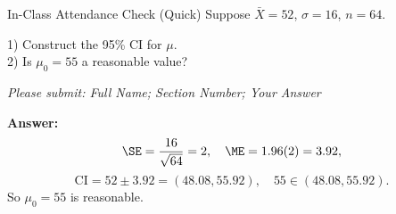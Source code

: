 \documentclass[aspectratio=169]{beamer}
\begin{document}
\begin{frame}{In-Class Attendance Check (Quick)}
  Suppose \(\bar X=52\), \(\sigma=16\), \(n=64\).

  \vspace{1mm}
  1) Construct the 95\% CI for \(\mu\).\\
  2) Is \(\mu_0=55\) a reasonable value?

  \vspace{3mm}
  \textit{Please submit: Full Name; Section Number; Your Answer}

  \pause
  \vspace{2mm}
  \textbf{Answer:}
  \[
    \SE=\frac{16}{\sqrt{64}}=2,
    \quad
    \ME=1.96(2)=3.92,
  \]
  \[
    \text{CI}=52\pm3.92=(48.08,55.92),
    \quad
    55\in(48.08,55.92).
  \]
  So \(\mu_0=55\) is reasonable.
\end{frame}
\end{document}
